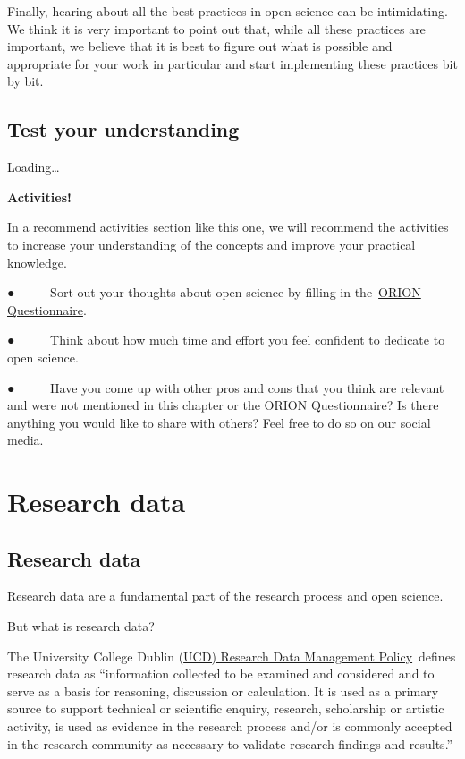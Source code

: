 \documentclass[
]{book}
\begin{document}
Finally, hearing about all the best practices in open science can be intimidating. We think it is very important to point out that, while all these practices are important, we believe that it is best to figure out what is possible and appropriate for your work in particular and start implementing these practices bit by bit.

\hypertarget{test-your-understanding-3}{%
\section{Test your understanding}\label{test-your-understanding-3}}

Loading\ldots{}

\textbf{Activities!}

In a recommend activities section like this one, we will recommend the activities to increase your understanding of the concepts and improve your practical knowledge.

● ~ ~ ~ Sort out your thoughts about open science by filling in the~\href{https://www.orion-openscience.eu/public/2019-01/ORION_Questionaire_RPFO-CRECIM.pdf}{}\href{https://www.orion-openscience.eu/public/2019-01/ORION_Questionaire_RPFO-CRECIM.pdf}{ORION Questionnaire}.

● ~ ~ ~ Think about how much time and effort you feel confident to dedicate to open science.

● ~ ~ ~ Have you come up with other pros and cons that you think are relevant and were not mentioned in this chapter or the ORION Questionnaire? Is there anything you would like to share with others? Feel free to do so on our social media.

\hypertarget{research-data}{%
\chapter{\texorpdfstring{\textbf{Research data}}{Research data}}\label{research-data}}

\hypertarget{research-data-1}{%
\section{\texorpdfstring{\textbf{Research data}}{Research data}}\label{research-data-1}}

Research data are a fundamental part of the research process and open science.

But what is research data?

The University College Dublin (\href{https://hub.ucd.ie/usis/!W_HU_MENU.P_PUBLISH?p_tag=GD-DOCLAND\&ID=227}{UCD) Research Data Management Policy}~defines research data as ``information collected to be examined and considered and to serve as a basis for reasoning, discussion or calculation. It is used as a primary source to support technical or scientific enquiry, research, scholarship or artistic activity, is used as evidence in the research process and/or is commonly accepted in the research community as necessary to validate research findings and results.''
\end{document}
